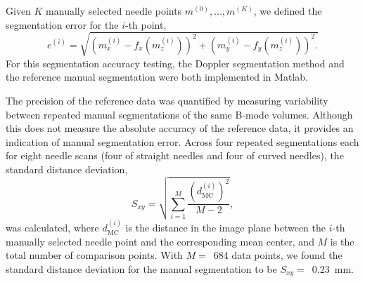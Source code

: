 Given $K$ manually selected needle points ${m}^{(0)}, \dotsc, {m}^{(K)}$, we defined the segmentation error for the $i$-th point,
\begin{equation}
e^{(i)} = \sqrt{ \left(m_x^{(i)}-f_x(m_z^{(i)})\right)^2 + \left(m_y^{(i)}-f_y(m_z^{(i)})\right)^2.} 
\end{equation}
\noindent For this segmentation accuracy testing, the Doppler segmentation method and the reference manual segmentation were both implemented in Matlab.

The precision of the reference data was quantified by measuring variability between repeated manual segmentations of the same B-mode volumes. Although this does not measure the absolute accuracy of the reference data, it provides an indication of manual segmentation error. Across four repeated segmentations each for eight needle scans (four of straight needles and four of curved needles), the standard distance deviation, 
\begin{equation}
S_{xy} = \sqrt{      \sum_{i=1}^{M} \frac{(d^{(i)}_{\text{MC}})^2}{M-2}       },
\end{equation}
\noindent was calculated, where $d^{(i)}_{\text{MC}}$ is the distance in the image plane between the $i$-th manually selected needle point and the corresponding mean center, and $M$ is the total number of comparison points. With $M =$~684 data points, we found the standard distance deviation for the manual segmentation to be $S_{xy} =$~0.23~mm.

